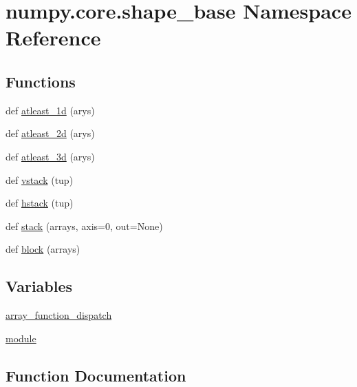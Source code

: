 \hypertarget{namespacenumpy_1_1core_1_1shape__base}{}\section{numpy.\+core.\+shape\+\_\+base Namespace Reference}
\label{namespacenumpy_1_1core_1_1shape__base}
\subsection*{Functions}
\begin{DoxyCompactItemize}
\item 
def \hyperlink{namespacenumpy_1_1core_1_1shape__base_a5af27672e574b2cf7ceb2984d88039a5}{atleast\+\_\+1d} (arys)
\item 
def \hyperlink{namespacenumpy_1_1core_1_1shape__base_a2dac0cd8ee016e5da4303c8f513baf7c}{atleast\+\_\+2d} (arys)
\item 
def \hyperlink{namespacenumpy_1_1core_1_1shape__base_a8bef53fc0dc78f353b9f5fa24ad37d62}{atleast\+\_\+3d} (arys)
\item 
def \hyperlink{namespacenumpy_1_1core_1_1shape__base_ac4d4dcd747c6e7b4918d01a365ead571}{vstack} (tup)
\item 
def \hyperlink{namespacenumpy_1_1core_1_1shape__base_aecb8183f9d76d9a46f7dc863a3ac6aad}{hstack} (tup)
\item 
def \hyperlink{namespacenumpy_1_1core_1_1shape__base_a2ea357df147fbf13fd1cca339996ecda}{stack} (arrays, axis=0, out=None)
\item 
def \hyperlink{namespacenumpy_1_1core_1_1shape__base_aeee9d1f4c9650bef14225f8cc0777a5b}{block} (arrays)
\end{DoxyCompactItemize}
\subsection*{Variables}
\begin{DoxyCompactItemize}
\item 
\hyperlink{namespacenumpy_1_1core_1_1shape__base_a45fc2ea67d94098cb4d63aca7a7ef92c}{array\+\_\+function\+\_\+dispatch}
\item 
\hyperlink{namespacenumpy_1_1core_1_1shape__base_ab77cd3e16b5cc379617cf4b820212866}{module}
\end{DoxyCompactItemize}


\subsection{Function Documentation}
\mbox{\label{namespacenumpy_1_1core_1_1shape__base_a5af27672e574b2cf7ceb2984d88039a5}} 
